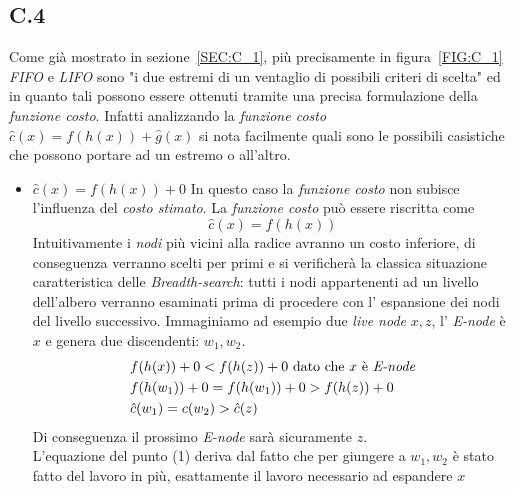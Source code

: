 \documentclass[a4paper]{article}
\begin{document}
\subsection{C.4}
Come già mostrato in sezione~\ref{SEC:C_1}, più precisamente in figura~\ref{FIG:C_1} \textit{FIFO} e \textit{LIFO} sono "i due estremi di un ventaglio di possibili criteri di scelta" ed in quanto tali possono essere ottenuti tramite una precisa formulazione della \textit{funzione costo}.
Infatti analizzando la \textit{funzione costo} $\hat c(x) = f(h(x)) + \hat g(x)$ si nota facilmente quali sono le possibili casistiche che possono portare ad un estremo o all'altro.
\begin{itemize}
	\item $\hat c(x) = f(h(x)) + 0$ In questo caso la \textit{funzione costo} non subisce l'influenza del \textit{costo stimato}.
		La \textit{funzione costo} può essere riscritta come $$\hat c(x) = f(h(x))$$
		Intuitivamente i \textit{nodi} più vicini alla radice avranno un costo inferiore, di conseguenza verranno scelti per primi e si verificherà la classica situazione caratteristica delle \textit{Breadth-search}: tutti i nodi appartenenti ad un livello dell'albero verranno esaminati prima di procedere con l' espansione dei nodi del livello successivo.
Immaginiamo ad esempio due \textit{live node} $x,z$, l' \textit{E-node} è $x$ e genera due discendenti: $w_1, w_2$.
                \begin{align}
                        &f(h(x)) + 0 < f(h(z)) + 0 \text{ dato che $x$ è \textit{E-node}} \notag \\
                        &f(h(w_1)) + 0 = f(h(w_1)) + 0 > f(h(z)) + 0 \\
                        &\hat c(w_1) = c(w_2) > \hat c(z) \notag
                \end{align}
Di conseguenza il prossimo \textit{E-node} sarà sicuramente $z$.\\
L'equazione del punto (1) deriva dal fatto che per giungere a $w_1,w_2$ è stato fatto del lavoro in più, esattamente il lavoro necessario ad espandere $x$


\end{itemize}
\end{document}
